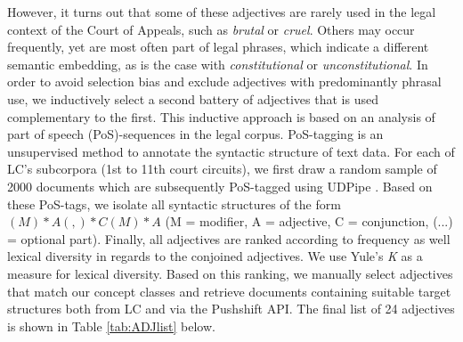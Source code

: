 \documentclass{article}
\begin{document}
However, it turns out that some of these adjectives are rarely used in the legal context of the Court of Appeals, such as \textit{brutal} or \textit{cruel}. Others may occur frequently, yet are most often part of legal phrases, which indicate a different semantic embedding, as is the case with \textit{constitutional} or \textit{unconstitutional}. In order to avoid selection bias and exclude adjectives with predominantly phrasal use, we inductively select a second battery of adjectives that is used complementary to the first. This inductive approach is based on an analysis of part of speech (PoS)-sequences in the legal corpus. PoS-tagging is an unsupervised method to annotate the syntactic structure of text data. For each of LC's subcorpora (1st to 11th court circuits), we first draw a random sample of 2000 documents which are subsequently PoS-tagged using UDPipe \citep{Straka2017, Straka2020}. Based on these PoS-tags, we isolate all syntactic structures of the form $(M)*A(,)*C(M)*A$ (M = modifier, A = adjective, C = conjunction, (...) = optional part). Finally, all adjectives are ranked according to frequency as well lexical diversity in regards to the conjoined adjectives. We use Yule's \textit{K} \citep{Yule1944, Tweedie1998} as a measure for lexical diversity.  %
Based on this ranking, we manually select adjectives that match our concept classes and retrieve documents containing suitable target structures both from LC and via the Pushshift API. %
The final list of 24 adjectives is shown in Table \ref{tab:ADJlist} below.
\end{document}
